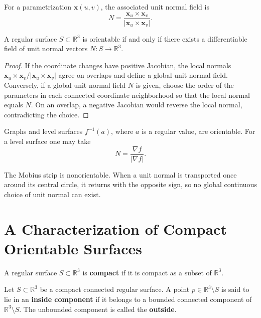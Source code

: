 \documentclass[12pt, oneside]{book}
\begin{document}
\begin{definition}
    For a parametrization $\mathbf{x}(u,v)$, the associated unit normal field is
    \[
        N=
        \frac{\mathbf{x}_u\times \mathbf{x}_v}
        {|\mathbf{x}_u\times \mathbf{x}_v|}.
    \]
\end{definition}

\begin{proposition}
    A regular surface $S\subset \mathbb{R}^3$ is orientable if and only if
    there exists a differentiable field of unit normal vectors
    $N:S\rightarrow \mathbb{R}^3$.
\end{proposition}

\begin{proof}
    If the coordinate changes have positive Jacobian, the local normals
    $\mathbf{x}_u\times \mathbf{x}_v/|\mathbf{x}_u\times \mathbf{x}_v|$
    agree on overlaps and define a global unit normal field.  Conversely, if a
    global unit normal field $N$ is given, choose the order of the parameters in
    each connected coordinate neighborhood so that the local normal equals
    $N$.  On an overlap, a negative Jacobian would reverse the local normal,
    contradicting the choice.
\end{proof}

\begin{example}
    Graphs and level surfaces $f^{-1}(a)$, where $a$ is a regular value, are
    orientable.  For a level surface one may take
    \[
        N=\frac{\nabla f}{|\nabla f|}.
    \]
\end{example}

\begin{example}
    The Mobius strip is nonorientable.  When a unit normal is transported once
    around its central circle, it returns with the opposite sign, so no global
    continuous choice of unit normal can exist.
\end{example}

\section{A Characterization of Compact Orientable Surfaces}

\begin{definition}
    A regular surface $S\subset \mathbb{R}^3$ is \textbf{compact} if it is
    compact as a subset of $\mathbb{R}^3$.
\end{definition}

\begin{definition}
    Let $S\subset \mathbb{R}^3$ be a compact connected regular surface.  A
    point $p\in \mathbb{R}^3\setminus S$ is said to lie in an
    \textbf{inside component} if it belongs to a bounded connected component
    of $\mathbb{R}^3\setminus S$.  The unbounded component is called the
    \textbf{outside}.
\end{definition}
\end{document}
